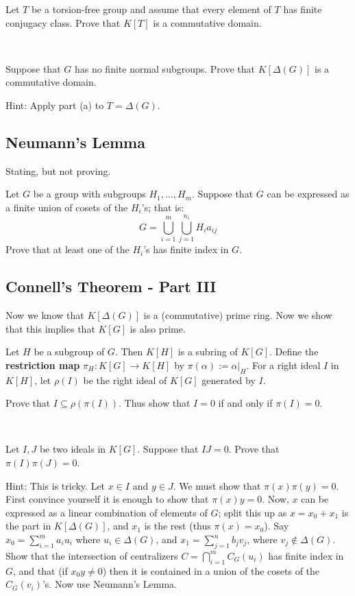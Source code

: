 \begin{exr}
	Let $T$ be a torsion-free group and assume that
	every element of $T$ has finite conjugacy class.
	Prove that $K[T]$ is a commutative domain.
\end{exr} \

\begin{exr}
	Suppose that $G$ has no finite normal subgroups.
	Prove that $K[\Delta(G)]$ is a commutative domain.

	Hint: Apply part (a) to $T=\Delta(G)$.
\end{exr}


\newpage
\subsection{Neumann's Lemma}
Stating, but not proving.

\begin{lm}
	Let $G$ be a group with subgroups $H_1,\ldots,H_m$.
	Suppose that $G$ can be expressed as a finite union of
	cosets of the $H_i$'s; that is:
	\begin{equation*}
		G = \bigcup_{i=1}^m\bigcup_{j=1}^{n_i} H_i a_{ij}
	\end{equation*}
	Prove that at least one of the $H_i$'s has finite index in $G$.
\end{lm}


\newpage
\subsection{Connell's Theorem - Part III}
Now we know that $K[\Delta(G)]$ is a (commutative) prime ring.
Now we show that this implies that $K[G]$ is also prime.

Let $H$ be a subgroup of $G$.
Then $K[H]$ is a subring of $K[G]$.
Define the \textbf{restriction map} $\pi_H:K[G]\rightarrow K[H]$ by $\pi(\alpha):=\alpha\vert_H$.
For a right ideal $I$ in $K[H]$, let $\rho(I)$ be the right ideal of $K[G]$ generated by $I$.

\begin{exr}
	Prove that $I\subseteq \rho(\pi(I))$.
	Thus show that $I=0$ if and only if $\pi(I)=0$.
\end{exr} \

\begin{exr}
	Let $I,J$ be two ideals in $K[G]$.
	Suppose that $IJ=0$. Prove that $\pi(I)\pi(J)=0$. 

	Hint: This is tricky. Let $x\in I$ and $y\in J$. We must show that $\pi(x)\pi(y)=0$.
	First convince yourself it is enough to show that $\pi(x)y=0$.
	Now, $x$ can be expressed as a linear combination of elements of $G$;
	split this up as $x=x_0+x_1$ is the part in $K[\Delta(G)]$, and $x_1$ is the rest (thus $\pi(x)=x_0$).
	Say $x_0=\sum_{i=1}^ma_iu_i$ where $u_i\in \Delta(G)$, and
	$x_1=\sum_{j=1}^nb_jv_j$, where $v_j\not\in \Delta(G)$.
	Show that the intersection of centralizers $C=\bigcap_{i=1}^m C_G(u_i)$
	has finite index in $G$, and that (if $x_0y\neq 0$) then it is contained in
	a union of the cosets of the $C_G(v_i)$'s.
	Now use Neumann's Lemma.
\end{exr} \

